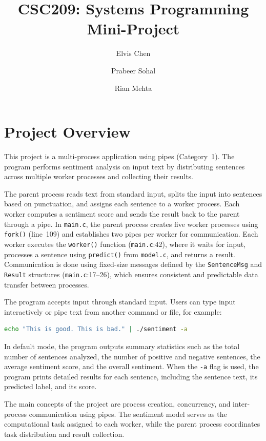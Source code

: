 \documentclass[12pt]{article}
\title{CSC209: Systems Programming Mini-Project}
\author{Elvis Chen \and Prabeer Sohal \and Rian Mehta}
\date{}
\begin{document}
\maketitle

\section{Project Overview}

This project is a multi-process application using pipes (Category~1). The
program performs sentiment analysis on input text by distributing sentences
across multiple worker processes and collecting their results.

The parent process reads text from standard input, splits the input into
sentences based on punctuation, and assigns each sentence to a worker
process. Each worker computes a sentiment score and sends the result back
to the parent through a pipe. In \texttt{main.c}, the parent process
creates five worker processes using \texttt{fork()} (line~109) and
establishes two pipes per worker for communication. Each worker executes
the \texttt{worker()} function (\texttt{main.c}:42), where it waits for
input, processes a sentence using \texttt{predict()} from
\texttt{model.c}, and returns a result. Communication is done using
fixed-size messages defined by the \texttt{SentenceMsg} and
\texttt{Result} structures (\texttt{main.c}:17--26), which ensures
consistent and predictable data transfer between processes.

The program accepts input through standard input. Users can type input
interactively or pipe text from another command or file, for example:

\begin{lstlisting}[language=bash]
echo "This is good. This is bad." | ./sentiment -a
\end{lstlisting}

In default mode, the program outputs summary statistics such as the total
number of sentences analyzed, the number of positive and negative
sentences, the average sentiment score, and the overall sentiment. When
the \texttt{-a} flag is used, the program prints detailed results for each
sentence, including the sentence text, its predicted label, and its score.

The main concepts of the project are process creation, concurrency, and
inter-process communication using pipes. The sentiment model serves as the
computational task assigned to each worker, while the parent process
coordinates task distribution and result collection.
\end{document}

